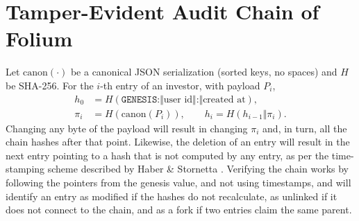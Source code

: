 \section{Tamper-Evident Audit Chain of Folium}
Let $\mathrm{canon}(\cdot)$ be a canonical JSON serialization (sorted keys, no spaces) and $H$ be SHA-256. For the $i$-th entry of an investor, with payload $P_i$,
\begin{align}
h_0 &= H(\texttt{GENESIS:} \Vert \text{user id} \Vert \texttt{:} \Vert \text{created at}),\\
\pi_i &= H(\mathrm{canon}(P_i)), \qquad h_i = H(h_{i-1} \Vert \pi_i).
\end{align}
Changing any byte of the payload will result in changing $\pi_i$ and, in turn, all the chain hashes after that point. Likewise, the deletion of an entry will result in the next entry pointing to a hash that is not computed by any entry, as per the time-stamping scheme described by Haber \& Stornetta \cite{b44}. Verifying the chain works by following the pointers from the genesis value, and not using timestamps, and will identify an entry as modified if the hashes do not recalculate, as unlinked if it does not connect to the chain, and as a fork if two entries claim the same parent.
